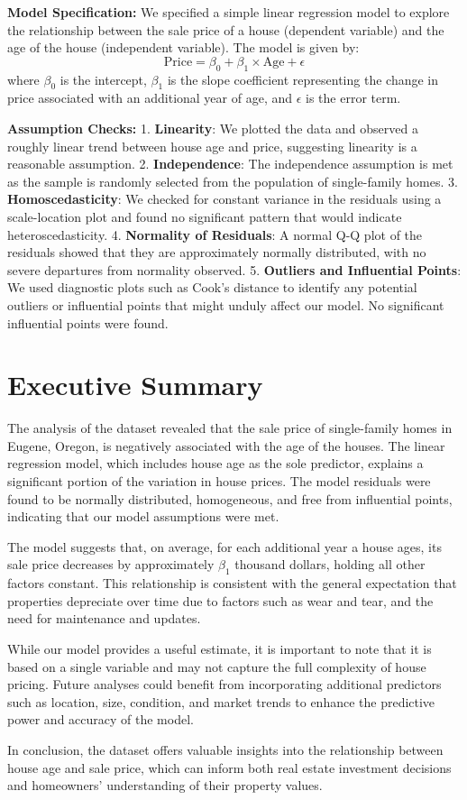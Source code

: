 \documentclass[
]{article}
\begin{document}
\textbf{Model Specification:} We specified a simple linear regression
model to explore the relationship between the sale price of a house
(dependent variable) and the age of the house (independent variable).
The model is given by:
\[ \text{Price} = \beta_0 + \beta_1 \times \text{Age} + \epsilon \]
where \(\beta_0\) is the intercept, \(\beta_1\) is the slope coefficient
representing the change in price associated with an additional year of
age, and \(\epsilon\) is the error term.

\textbf{Assumption Checks:} 1. \textbf{Linearity}: We plotted the data
and observed a roughly linear trend between house age and price,
suggesting linearity is a reasonable assumption. 2.
\textbf{Independence}: The independence assumption is met as the sample
is randomly selected from the population of single-family homes. 3.
\textbf{Homoscedasticity}: We checked for constant variance in the
residuals using a scale-location plot and found no significant pattern
that would indicate heteroscedasticity. 4. \textbf{Normality of
Residuals}: A normal Q-Q plot of the residuals showed that they are
approximately normally distributed, with no severe departures from
normality observed. 5. \textbf{Outliers and Influential Points}: We used
diagnostic plots such as Cook's distance to identify any potential
outliers or influential points that might unduly affect our model. No
significant influential points were found.

\section{Executive Summary}\label{executive-summary-2}

The analysis of the dataset revealed that the sale price of
single-family homes in Eugene, Oregon, is negatively associated with the
age of the houses. The linear regression model, which includes house age
as the sole predictor, explains a significant portion of the variation
in house prices. The model residuals were found to be normally
distributed, homogeneous, and free from influential points, indicating
that our model assumptions were met.

The model suggests that, on average, for each additional year a house
ages, its sale price decreases by approximately \(\beta_1\) thousand
dollars, holding all other factors constant. This relationship is
consistent with the general expectation that properties depreciate over
time due to factors such as wear and tear, and the need for maintenance
and updates.

While our model provides a useful estimate, it is important to note that
it is based on a single variable and may not capture the full complexity
of house pricing. Future analyses could benefit from incorporating
additional predictors such as location, size, condition, and market
trends to enhance the predictive power and accuracy of the model.

In conclusion, the dataset offers valuable insights into the
relationship between house age and sale price, which can inform both
real estate investment decisions and homeowners' understanding of their
property values.
\end{document}
